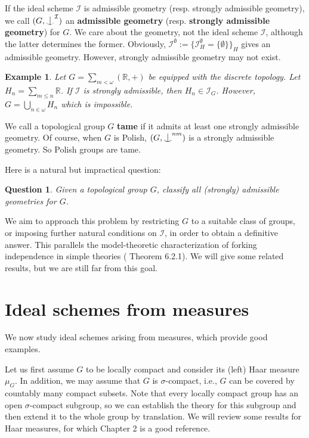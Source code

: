 \documentclass{article}
\newtheorem{example}[definition]{Example}
\newtheorem{ques}[definition]{Question}
\newcommand{\R}{\mathbb{R}}
\newcommand{\I}{\mathcal{I}}
\newcommand{\ind}{\mathrel{\raise0.2ex\hbox{\ooalign{\hidewidth$\vert$\hidewidth\cr\raise-0.9ex\hbox{$\smile$}}}}}
\begin{document}
If the ideal scheme $\I$ is {admissible geometry} (resp. {strongly admissible geometry}), we call $(G,\ind^\I)$ an \textbf{admissible geometry} (resp. \textbf{strongly admissible geometry}) for $G$. We care about the geometry, not the ideal scheme $\I$, although the latter determines the former.
Obviously, $\I^\emptyset:=\{\I_H^\emptyset=\{\emptyset\}\}_H$ gives an admissible geometry. However, strongly admissible geometry may not exist. 

\begin{example}
Let $G=\sum_{m<\omega} (\R,+)$ be equipped with the discrete topology. Let $H_n=\sum_{m\leq n} \R$. If $\I$ is strongly admissible, then $H_n\in \I_G$. However, $G=\bigcup_{n\in \omega} H_n$ which is impossible.
\end{example}

We call a topological group $G$ \textbf{tame} if it admits at least one strongly admissible geometry. 
Of course, when $G$ is Polish, $(G,\ind^{nm})$ is a strongly admissible geometry. So Polish groups are tame.

Here is a natural but impractical  question:

\begin{ques}
Given a topological group $G$, classify all (strongly) admissible geometries for $G$.
\end{ques}

We aim to approach this problem by restricting $G$ to a suitable class of groups, or imposing further natural conditions on $\I$, in order to obtain a definitive answer. This parallels the model-theoretic characterization of forking independence in simple theories (\cite{Simple} Theorem 6.2.1). We will give some related results, but we are still far from this goal.






\section{Ideal schemes from measures}\label{section-2}

We now study ideal schemes arising from measures, which provide good examples. 

Let us first assume $G$ to be locally compact and consider its (left) Haar measure $\mu_G$. In addition, we may assume that $G$ is $\sigma$-compact, i.e., $G$ can be covered by countably many compact subsets. Note that every locally compact group has an open $\sigma$-compact subgroup, so we can establish the theory for this subgroup and then extend it to the whole group by translation.  We will review some results for Haar measures, for which  \cite{Book} Chapter 2 is a good reference. 
\end{document}
